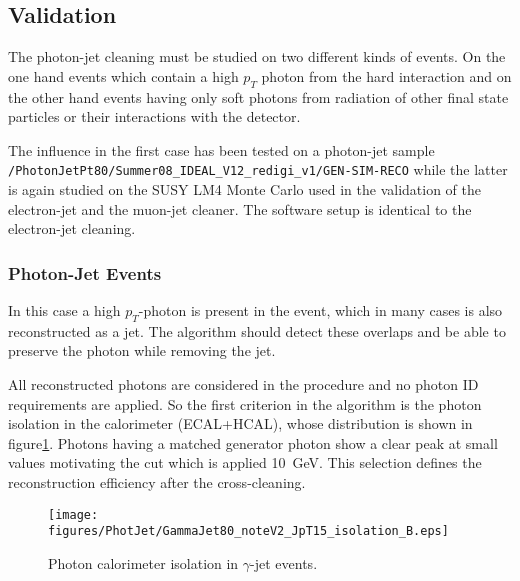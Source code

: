 \documentclass{cmspaper}
\begin{document}
\subsection{Validation}
The photon-jet cleaning must be studied on two different kinds of
events. On the one hand events which contain a high $p_T$ photon from the hard
interaction and on the other hand events having only soft photons from
radiation of other final state particles or their interactions with the
detector.

The influence in the first case has been tested on a photon-jet sample
\newline\texttt{/PhotonJetPt80/Summer08\_IDEAL\_V12\_redigi\_v1/GEN-SIM-RECO} while
the latter is again studied on the SUSY LM4 Monte Carlo used in the validation
of the electron-jet and the muon-jet cleaner.  The software setup is identical
to the electron-jet cleaning.

\subsubsection{Photon-Jet Events}
In this case a high $p_T$-photon is present in the event, which in many cases
is also reconstructed as a jet. The algorithm should detect these overlaps and
be able to preserve the photon while removing the jet.

All reconstructed photons are considered in the procedure and no
photon ID requirements are applied. So the first criterion in the algorithm is
the photon isolation in the calorimeter (ECAL+HCAL), whose distribution is
shown in figure\ref{fig:pjPhotIso}. Photons having a matched generator photon
show a clear peak at small values motivating the cut which is applied 10\ GeV.
This selection defines the reconstruction efficiency after the cross-cleaning.
\begin{figure}[hbtp]
  \begin{center}
    \texttt{[image: figures/PhotJet/GammaJet80\_noteV2\_JpT15\_isolation\_B.eps]}
    \caption{Photon calorimeter isolation in $\gamma$-jet events.}
    \label{fig:pjPhotIso}
  \end{center}
\end{figure}
\end{document}

